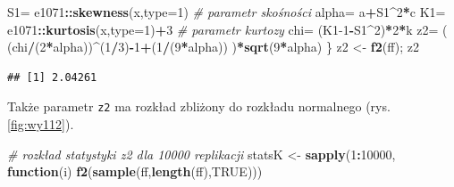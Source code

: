 \documentclass[polish,]{book}
\newenvironment{Shaded}{\begin{snugshade}}{\end{snugshade}}
\newcommand{\CommentTok}[1]{\textcolor[rgb]{0.56,0.35,0.01}{\textit{#1}}}
\newcommand{\ControlFlowTok}[1]{\textcolor[rgb]{0.13,0.29,0.53}{\textbf{#1}}}
\newcommand{\DataTypeTok}[1]{\textcolor[rgb]{0.13,0.29,0.53}{#1}}
\newcommand{\DecValTok}[1]{\textcolor[rgb]{0.00,0.00,0.81}{#1}}
\newcommand{\KeywordTok}[1]{\textcolor[rgb]{0.13,0.29,0.53}{\textbf{#1}}}
\newcommand{\NormalTok}[1]{#1}
\newcommand{\OperatorTok}[1]{\textcolor[rgb]{0.81,0.36,0.00}{\textbf{#1}}}
\newcommand{\OtherTok}[1]{\textcolor[rgb]{0.56,0.35,0.01}{#1}}
\newcommand{\StringTok}[1]{\textcolor[rgb]{0.31,0.60,0.02}{#1}}
\begin{document}
\begin{Shaded}
\begin{Highlighting}[]
\NormalTok{  S1=}\StringTok{ }\NormalTok{e1071}\OperatorTok{::}\KeywordTok{skewness}\NormalTok{(x,}\DataTypeTok{type=}\DecValTok{1}\NormalTok{)   }\CommentTok{# parametr skośności}
\NormalTok{  alpha=}\StringTok{ }\NormalTok{a}\OperatorTok{+}\NormalTok{S1}\OperatorTok{^}\DecValTok{2}\OperatorTok{*}\NormalTok{c}
\NormalTok{  K1=}\StringTok{ }\NormalTok{e1071}\OperatorTok{::}\KeywordTok{kurtosis}\NormalTok{(x,}\DataTypeTok{type=}\DecValTok{1}\NormalTok{)}\OperatorTok{+}\DecValTok{3} \CommentTok{# parametr kurtozy}
\NormalTok{  chi=}\StringTok{ }\NormalTok{(K1}\DecValTok{-1}\OperatorTok{-}\NormalTok{S1}\OperatorTok{^}\DecValTok{2}\NormalTok{)}\OperatorTok{*}\DecValTok{2}\OperatorTok{*}\NormalTok{k}
\NormalTok{  z2=}\StringTok{ }\NormalTok{( (chi}\OperatorTok{/}\NormalTok{(}\DecValTok{2}\OperatorTok{*}\NormalTok{alpha))}\OperatorTok{^}\NormalTok{(}\DecValTok{1}\OperatorTok{/}\DecValTok{3}\NormalTok{)}\OperatorTok{-}\DecValTok{1}\OperatorTok{+}\NormalTok{(}\DecValTok{1}\OperatorTok{/}\NormalTok{(}\DecValTok{9}\OperatorTok{*}\NormalTok{alpha)) )}\OperatorTok{*}\KeywordTok{sqrt}\NormalTok{(}\DecValTok{9}\OperatorTok{*}\NormalTok{alpha)}
\NormalTok{  \}}
\NormalTok{z2 <-}\StringTok{ }\KeywordTok{f2}\NormalTok{(ff); z2}
\end{Highlighting}
\end{Shaded}

\begin{verbatim}
## [1] 2.04261
\end{verbatim}

Także parametr \texttt{z2} ma rozkład zbliżony do rozkładu normalnego (rys. \ref{fig:wy112}).

\begin{Shaded}
\begin{Highlighting}[]
\CommentTok{# rozkład statystyki z2 dla 10000 replikacji}
\NormalTok{statsK <-}\StringTok{ }\KeywordTok{sapply}\NormalTok{(}\DecValTok{1}\OperatorTok{:}\DecValTok{10000}\NormalTok{, }\ControlFlowTok{function}\NormalTok{(i) }\KeywordTok{f2}\NormalTok{(}\KeywordTok{sample}\NormalTok{(ff,}\KeywordTok{length}\NormalTok{(ff),}\OtherTok{TRUE}\NormalTok{)))}
\end{Highlighting}
\end{Shaded}
\end{document}

